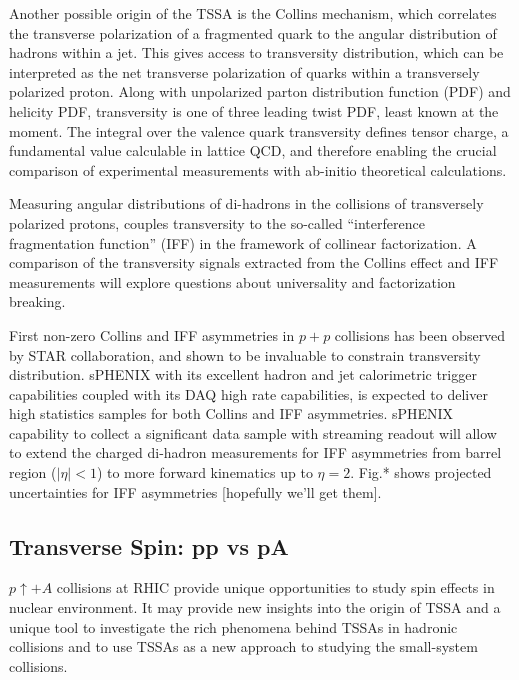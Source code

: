 Another possible origin of the TSSA is the Collins mechanism, which correlates the transverse polarization of a fragmented quark to the angular distribution of hadrons within a jet. This gives access to transversity distribution, which can be interpreted as the net transverse polarization of quarks within a transversely polarized proton. Along with unpolarized parton distribution function (PDF) and helicity PDF, transversity is one of three leading twist PDF, least known at the moment. The integral over the valence quark transversity defines tensor charge, a fundamental value calculable in lattice QCD, and therefore enabling the crucial comparison of experimental measurements with ab-initio theoretical calculations.

Measuring angular distributions of di-hadrons in the collisions of transversely polarized protons, couples transversity to the so-called “interference fragmentation function” (IFF) in the framework of collinear factorization. A comparison of the transversity signals extracted from the Collins effect and IFF measurements will explore questions about universality and factorization breaking. 

First non-zero Collins and IFF asymmetries in $p+p$ collisions has been observed by STAR collaboration, and shown to be invaluable to constrain transversity distribution. sPHENIX with its excellent hadron and jet calorimetric trigger capabilities coupled with its DAQ high rate capabilities, is expected to deliver high statistics samples for both Collins and IFF asymmetries. sPHENIX capability to collect a significant data sample with streaming readout will allow to extend the charged di-hadron measurements for IFF asymmetries from barrel region ($|\eta|<1$) to more forward kinematics up to $\eta=2$. Fig.* shows projected uncertainties for IFF asymmetries [hopefully we'll get them].

\subsection {Transverse Spin: pp vs pA}

$p\uparrow+A$ collisions at RHIC provide unique opportunities to study spin effects in nuclear environment. It may provide new insights into the origin of TSSA and a unique tool to investigate the rich phenomena behind TSSAs in hadronic collisions and to use TSSAs as a new approach to studying the small-system collisions.

